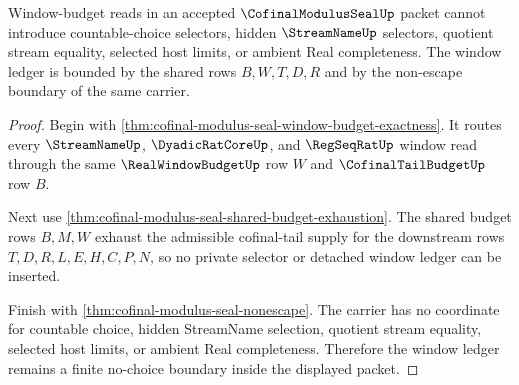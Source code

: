 \begin{theorem}
\label{thm:cofinal-modulus-seal-window-ledger-nochoice-boundary}
Window-budget reads in an accepted $\CofinalModulusSealUp$ packet cannot introduce countable-choice selectors, hidden $\StreamNameUp$ selectors, quotient stream equality, selected host limits, or ambient Real completeness. The window ledger is bounded by the shared rows $B,W,T,D,R$ and by the non-escape boundary of the same carrier.
\end{theorem}
\begin{proof}
Begin with \autoref{thm:cofinal-modulus-seal-window-budget-exactness}. It routes every $\StreamNameUp$, $\DyadicRatCoreUp$, and $\RegSeqRatUp$ window read through the same $\RealWindowBudgetUp$ row $W$ and $\CofinalTailBudgetUp$ row $B$.

Next use \autoref{thm:cofinal-modulus-seal-shared-budget-exhaustion}. The shared budget rows $B,M,W$ exhaust the admissible cofinal-tail supply for the downstream rows $T,D,R,L,E,H,C,P,N$, so no private selector or detached window ledger can be inserted.

Finish with \autoref{thm:cofinal-modulus-seal-nonescape}. The carrier has no coordinate for countable choice, hidden StreamName selection, quotient stream equality, selected host limits, or ambient Real completeness. Therefore the window ledger remains a finite no-choice boundary inside the displayed packet.
\end{proof}

